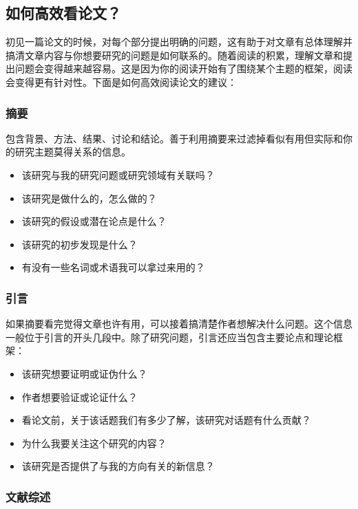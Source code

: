 \documentclass[cn,hazy,blue,14pt,screen]{elegantnote} %
\begin{document}
\subsection{如何高效看论文？}

初见一篇论文的时候，对每个部分提出明确的问题，这有助于对文章有总体理解并搞清文章内容与你想要研究的问题是如何联系的。随着阅读的积累，理解文章和提出问题会变得越来越容易。这是因为你的阅读开始有了围绕某个主题的框架，阅读会变得更有针对性。下面是如何高效阅读论文的建议：

\subsubsection{摘要}

包含背景、方法、结果、讨论和结论。善于利用摘要来过滤掉看似有用但实际和你的研究主题莫得关系的信息。

\begin{itemize}
  \item 该研究与我的研究问题或研究领域有关联吗？
  \item 该研究是做什么的，怎么做的？
  \item 该研究的假设或潜在论点是什么？
  \item 该研究的初步发现是什么？
  \item 有没有一些名词或术语我可以拿过来用的？
\end{itemize}

\subsubsection{引言}

如果摘要看完觉得文章也许有用，可以接着搞清楚作者想解决什么问题。这个信息一般位于引言的开头几段中。除了研究问题，引言还应当包含主要论点和理论框架：

\begin{itemize}
  \item 该研究想要证明或证伪什么？
  \item 作者想要验证或论证什么？
  \item 看论文前，关于该话题我们有多少了解，该研究对话题有什么贡献？
  \item 为什么我要关注这个研究的内容？
  \item 该研究是否提供了与我的方向有关的新信息？
\end{itemize}

\subsubsection{文献综述}
\end{document}
